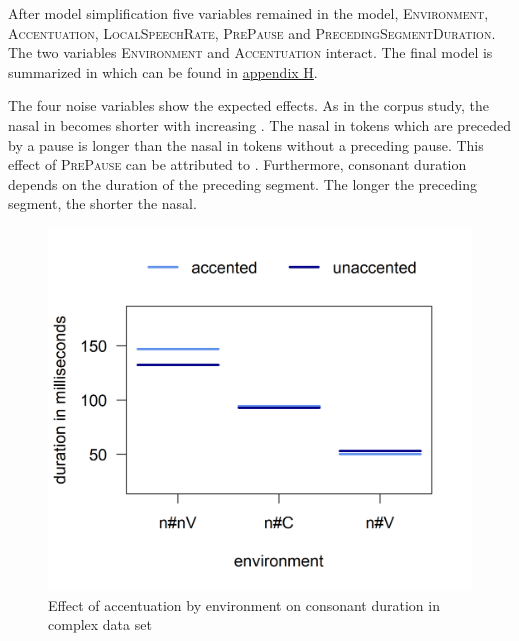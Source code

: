After model simplification five variables remained in the model, \textsc{Environment}, \textsc{Accentuation}, \textsc{LocalSpeechRate}, \textsc{PrePause} and \textsc{PrecedingSegmentDuration}. The two variables \textsc{Environment} and \textsc{Accentuation} interact. The final model is summarized in  which can be found in \hyperref[Appendix H: Model Summaries Experiment]{appendix H}.


The four noise variables show the expected effects. As in the corpus study, the nasal in  becomes shorter with increasing . 
The nasal in tokens which are preceded by a pause is longer than the nasal in tokens without a preceding pause. This effect of \textsc{PrePause}  can be attributed to .  
Furthermore, consonant duration depends on the duration of the preceding segment. The longer the preceding segment, the shorter the nasal. 

\begin{figure}
	
	\includegraphics [scale=0.5] {images/Experiment/unModelInterCatAcc}
	\caption{Effect of accentuation by environment on consonant duration in complex data set}
	\label{fig:NumNasal unComplex experiment}
\end{figure}


